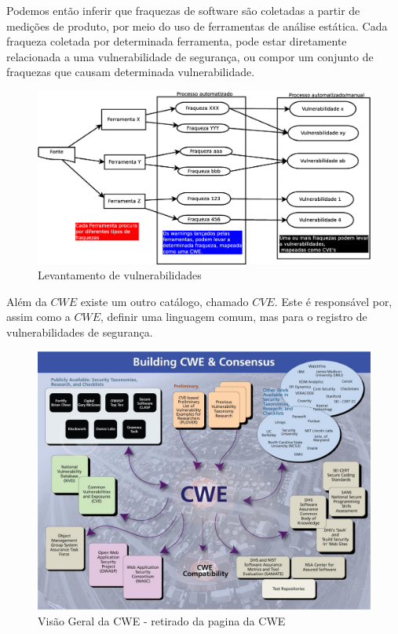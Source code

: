 Podemos então inferir que fraquezas de software são coletadas a partir de medições de produto, por meio do uso de ferramentas de análise estática.
Cada fraqueza coletada por determinada ferramenta, pode estar diretamente relacionada a uma vulnerabilidade de segurança, ou compor um conjunto de fraquezas que causam determinada vulnerabilidade.

\begin{figure}[h]
	\centering
	\label{fig02}
        \includegraphics[scale=0.38]{figuras/vul1.eps}
	\caption{Levantamento de vulnerabilidades}
\end{figure}

Além da $CWE$ existe um outro catálogo, chamado $CVE$. Este é responsável por, assim como a $CWE$, definir uma linguagem comum, mas para o registro
de vulnerabilidades de segurança.

\begin{figure}[h]
	\centering
	\label{fig03}
        \includegraphics[scale=0.38]{figuras/lg_consensus.eps}
        \caption{Visão Geral da CWE - retirado da pagina da CWE}
\end{figure}
